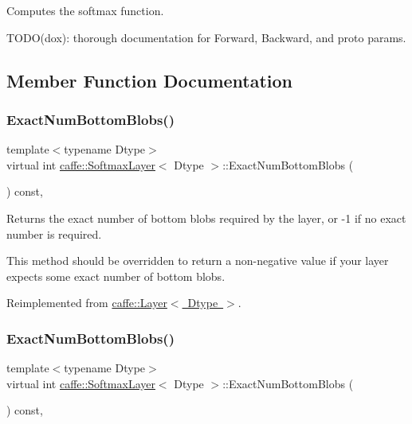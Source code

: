 Computes the softmax function. 

T\+O\+D\+O(dox)\+: thorough documentation for Forward, Backward, and proto params. 

\subsection{Member Function Documentation}
\mbox{\label{classcaffe_1_1_softmax_layer_afe44488dde78e6bcf6d4bdad97ee4986}} 
\subsubsection{\texorpdfstring{Exact\+Num\+Bottom\+Blobs()}{ExactNumBottomBlobs()}\hspace{0.1cm}{\footnotesize\ttfamily [1/2]}}
{\footnotesize\ttfamily template$<$typename Dtype$>$ \\
virtual int \mbox{\hyperlink{classcaffe_1_1_softmax_layer}{caffe\+::\+Softmax\+Layer}}$<$ Dtype $>$\+::Exact\+Num\+Bottom\+Blobs (\begin{DoxyParamCaption}{ }\end{DoxyParamCaption}) const\hspace{0.3cm}{\ttfamily [inline]}, {\ttfamily [virtual]}}



Returns the exact number of bottom blobs required by the layer, or -\/1 if no exact number is required. 

This method should be overridden to return a non-\/negative value if your layer expects some exact number of bottom blobs. 

Reimplemented from \mbox{\hyperlink{classcaffe_1_1_layer_a8e5ee0494d85f5f55fc4396537cbc60f}{caffe\+::\+Layer$<$ Dtype $>$}}.

\mbox{\label{classcaffe_1_1_softmax_layer_afe44488dde78e6bcf6d4bdad97ee4986}} 
\subsubsection{\texorpdfstring{Exact\+Num\+Bottom\+Blobs()}{ExactNumBottomBlobs()}\hspace{0.1cm}{\footnotesize\ttfamily [2/2]}}
{\footnotesize\ttfamily template$<$typename Dtype$>$ \\
virtual int \mbox{\hyperlink{classcaffe_1_1_softmax_layer}{caffe\+::\+Softmax\+Layer}}$<$ Dtype $>$\+::Exact\+Num\+Bottom\+Blobs (\begin{DoxyParamCaption}{ }\end{DoxyParamCaption}) const\hspace{0.3cm}{\ttfamily [inline]}, {\ttfamily [virtual]}}



